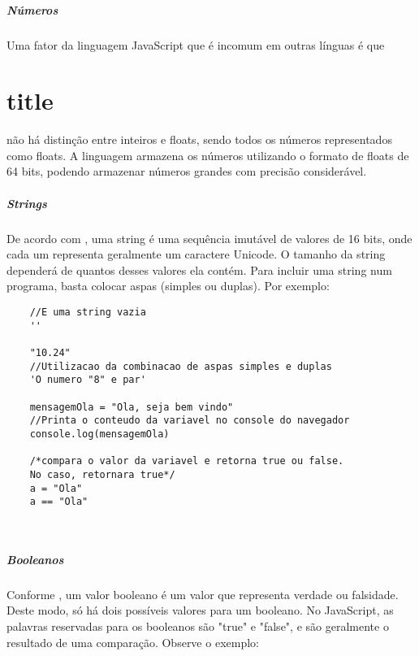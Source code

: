 	\subsubsection{Números}
	Uma fator da linguagem JavaScript que é incomum em outras línguas é que \part{title}não há distinção entre inteiros e floats, sendo todos os números representados como floats. 
	A linguagem armazena os números utilizando o formato de floats de 64 bits, podendo armazenar números grandes com precisão considerável.
	
	\subsubsection{Strings}
	De acordo com \cite{flanagan2020javascript}, uma string é uma sequência imutável de valores de 16 bits, onde cada um representa geralmente um caractere Unicode. O tamanho da string dependerá de quantos desses valores ela contém. Para incluir uma string num programa, basta colocar aspas (simples ou duplas). Por exemplo:
	\newline
	
	\begin{lstlisting}
	//E uma string vazia
	''
	
	"10.24"	
	//Utilizacao da combinacao de aspas simples e duplas
	'O numero "8" e par'				
	
	mensagemOla = "Ola, seja bem vindo" 
	//Printa o conteudo da variavel no console do navegador
	console.log(mensagemOla)	
	
	/*compara o valor da variavel e retorna true ou false. 
	No caso, retornara true*/
	a = "Ola"
	a == "Ola"
	
	
	\end{lstlisting}
	
	\subsubsection{Booleanos}
	Conforme \cite{powers2015javascript}, um valor booleano é um valor que representa verdade ou falsidade. Deste modo, só há dois possíveis valores para um booleano. No JavaScript, as palavras reservadas para os booleanos são "true" e "false", e são geralmente o resultado de uma comparação. Observe o exemplo:
	\newline
	

